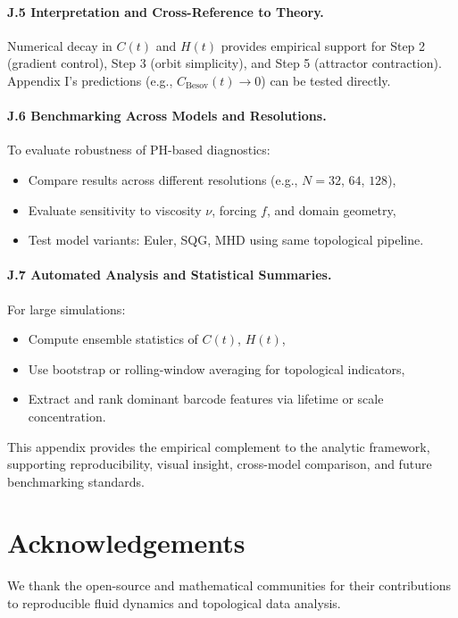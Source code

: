\documentclass[11pt]{article}
\theoremstyle{definition}
\begin{document}
\paragraph{J.5 Interpretation and Cross-Reference to Theory.}
Numerical decay in $C(t)$ and $H(t)$ provides empirical support for Step 2 (gradient control), Step 3 (orbit simplicity), and Step 5 (attractor contraction).
Appendix I's predictions (e.g., $C_{\text{Besov}}(t) \to 0$) can be tested directly.

\paragraph{J.6 Benchmarking Across Models and Resolutions.}
To evaluate robustness of PH-based diagnostics:
\begin{itemize}
  \item Compare results across different resolutions (e.g., $N=32$, $64$, $128$),
  \item Evaluate sensitivity to viscosity $\nu$, forcing $f$, and domain geometry,
  \item Test model variants: Euler, SQG, MHD using same topological pipeline.
\end{itemize}

\paragraph{J.7 Automated Analysis and Statistical Summaries.}
For large simulations:
\begin{itemize}
  \item Compute ensemble statistics of $C(t)$, $H(t)$,
  \item Use bootstrap or rolling-window averaging for topological indicators,
  \item Extract and rank dominant barcode features via lifetime or scale concentration.
\end{itemize}

This appendix provides the empirical complement to the analytic framework, supporting reproducibility, visual insight, cross-model comparison, and future benchmarking standards.


\section*{Acknowledgements}
We thank the open-source and mathematical communities for their contributions to reproducible fluid dynamics and topological data analysis.
\end{document}
